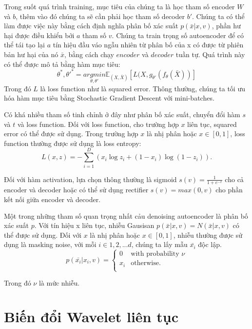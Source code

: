 Trong suốt quá trình training, mục tiêu của chúng ta là học tham số encoder $W$ và $b$, thêm vào đó chúng ta sẽ cần phải học tham số decoder $b'$. Chúng ta có thể làm được việc này bằng cách định nghĩa phân bố xác suất $p(\bar{x}|x, v)$, phần hư hại được điều khiển bởi $a$ tham số $v$. Chúng ta train trọng số autoencoder để có thể tái tạo lại $a$ tín hiệu đầu váo ngẫu nhiên từ phân bố của x có được từ phiên bản hư hại của nó $\bar{x}$, bằng cách chạy $encoder$ và $decoder$ tuần tự. Quá trình này có thể được mô tả bằng hàm mục tiêu:
\begin{equation}
\theta^*, \theta'^* = \underset{\theta, \theta'}{arg min} \mathbb{E}_{(X, \bar{X})}[L(X, g_{\theta'}(f_{\theta}(\bar{X}))]
\end{equation}
Trong đó $L$ là loss function như là squared error. Thông thường, chúng ta tối ưu hóa hàm mục tiêu bằng Stochastic Gradient Descent với mini-batches.  

Có khá nhiều tham số tinh chỉnh ở đây như phân bố xác suất, chuyển đổi hàm $s$ và $t$ và loss function. Đối với loss function, cho trường hợp $x$ liên tục, squared error có thể được sử dụng. Trong trường hợp $x$ là nhị phân hoặc $x \in  [0, 1]$, loss function thường được sử dụng là loss entropy:
\begin{equation}
L(x, z) = -\sum_{i=1}^D (x_i \log z_i + (1-x_i) \log (1-z_i)).
\end{equation}

Đối với hàm activation, lựa chọn thông thường là sigmoid $s(v) = \frac{1}{1+e^{-v}}$ cho cả encoder và decoder hoặc có thể sử dụng rectifier $s(v) = max(0, v)$ cho phần kết nối giữa encoder và decoder.

Một trong những tham số quan trọng nhất cảu denoising autoencoder là phân bố xác suất $p$. Với tín hiệu x liên tục, nhiễu Gausisan $p(\bar{x}|x, v) = N (\bar{x}|x, v)$ có thể được sử dụng. Đối với $x$ là nhị phân hoặc $x \in  [0, 1]$, nhiễu thường được sử dụng là masking noise, với mỗi $i \in 1, 2, ... d$, chúng ta lấy mẫu $\bar{x_i}$ độc lập.
\begin{equation}
p(\bar{x_i}|x_i, v) =     
	\begin{cases}
      0 & \text{with probability $\nu$}\\
      x_i & \text{otherwise.}\\
    \end{cases} 
\end{equation}

Trong đó $\nu$ là mức nhiễu. 

\section{Biến đổi Wavelet liên tục}
